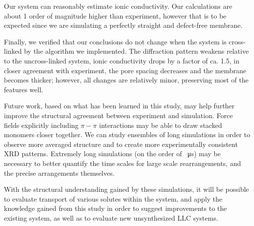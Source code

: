 \documentclass[journal=jpcbfk,manuscript=article]{achemso}
\begin{document}

  Our system can reasonably estimate ionic conductivity. Our
  calculations are about 1 order of magnitude higher than experiment, however
  that is to be expected since we are simulating a perfectly straight and
  defect-free membrane. 

  Finally, we verified that our conclusions do not change when the system is
  cross-linked by the algorithm we implemented. The diffraction pattern weakens
  relative to the uncross-linked system, 
  ionic conductivity drops by a factor
  of ca. 1.5, in closer agreement with experiment, the pore spacing decreases and
  the membrane becomes thicker; however, all changes are relatively minor, 
  preserving most of the features well.


  Future work, based on what has been learned in this study, may help further
  improve the structural agreement between experiment and simulation. Force 
  fields explicitly including $\pi-\pi$ interactions may be able to draw stacked
  monomers closer together. We can study ensembles of long simulations in order
  to observe more averaged structure and to create more experimentally consistent
  XRD patterns. Extremely long simulations (on the order of \SI{}{\micro s}) may
  be necessary to better quantify the time scales for large scale rearrangements,
  and the precise arrangements themselves.

  With the structural understanding gained by these simulations, it will be
  possible to evaluate transport of various solutes within the system, and apply the
  knowledge gained from this study in order to suggest improvements to the
  existing system, as well as to evaluate new unsynthesized LLC systems.

  \clearpage
  
\end{document}
